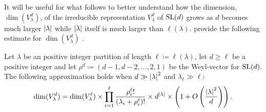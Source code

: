 \documentclass[notitlepage, 10pt]{article}
\begin{document}
It will be useful for what follows to better understand how the dimension, $\dim(V_{\lambda}^{d})$, of the irreducible representation $V_{\lambda}^{d}$ of $\operatorname{SL}(d)$ grows as $d$ becomes much larger $\left|\lambda\right|$ while $\left|\lambda\right|$ itself is much larger than $\ell(\lambda)$.
 provide the following estimate for $\dim(V_{\lambda}^{d})$ \cite{itzykson1966unitary}.
\begin{lem}
    \label{lem:in_estimate}
    Let $\lambda$ be an positive integer partition of length $\ell \coloneqq \ell(\lambda)$, let $d \geq \ell$ be a positive integer and let $\rho^d \coloneqq (d-1, d-2, \ldots, 2, 1)$ be the Weyl-vector for $\operatorname{SL}(d)$.
    The following approximation holds when $d \gg \left|\lambda\right|^2$ and $\lambda_{\ell} \gg \ell$:
    \begin{equation}
        \label{eq:in_estimate}
        \dim(V_{\lambda}^{d}) = \dim(V_{\lambda}^{\ell}) \times \prod_{i=1}^{\ell}\frac{\rho^{\ell}_{i}!}{(\lambda_i + \rho^{\ell}_{i}) !}  \times d^{\left|\lambda\right|} \times \left(1 + O\left(\frac{\left|\lambda\right|^{2}}{d}\right)\right).
    \end{equation}
\end{lem}
\end{document}

